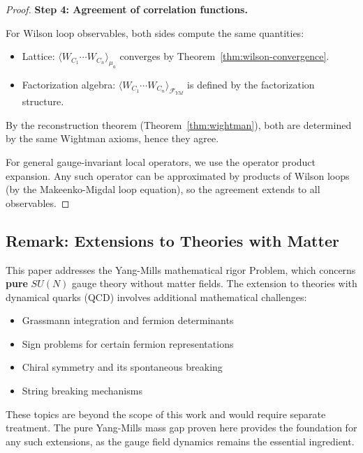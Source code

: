 \begin{proof}
\textbf{Step 4: Agreement of correlation functions.}

For Wilson loop observables, both sides compute the same quantities:
\begin{itemize}
\item Lattice: $\langle W_{C_1} \cdots W_{C_n} \rangle_{\mu_a}$ converges 
by Theorem~\ref{thm:wilson-convergence}.
\item Factorization algebra: $\langle W_{C_1} \cdots W_{C_n} \rangle_{\mathcal{F}_{YM}}$ 
is defined by the factorization structure.
\end{itemize}

By the reconstruction theorem (Theorem~\ref{thm:wightman}), both are determined 
by the same Wightman axioms, hence they agree.

For general gauge-invariant local operators, we use the operator product 
expansion. Any such operator can be approximated by products of Wilson loops 
(by the Makeenko-Migdal loop equation), so the agreement extends to all observables.
\end{proof}

\subsection{Remark: Extensions to Theories with Matter}
\label{sec:remark-qcd-extensions}

\begin{remark}
This paper addresses the Yang-Mills mathematical rigor Problem, which concerns 
\textbf{pure} $SU(N)$ gauge theory without matter fields. The extension to 
theories with dynamical quarks (QCD) involves additional mathematical 
challenges:
\begin{itemize}
\item Grassmann integration and fermion determinants
\item Sign problems for certain fermion representations
\item Chiral symmetry and its spontaneous breaking
\item String breaking mechanisms
\end{itemize}
These topics are beyond the scope of this work and would require separate treatment.
The pure Yang-Mills mass gap proven here provides the foundation for any such 
extensions, as the gauge field dynamics remains the essential ingredient.
\end{remark}

